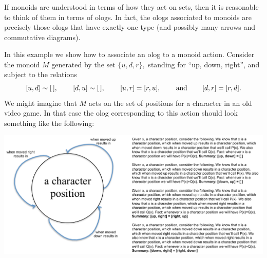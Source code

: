 \documentclass[CT4S-EN-RU]{subfiles}
\begin{document}

\subsubsection{}

\begin{blockENG}
If monoids are understood in terms of how they act on sets, then it is reasonable to think of them in terms of ologs. In fact, the ologs associated to monoids are precisely those ologs that have exactly one type (and possibly many arrows and commutative diagrams).
\end{blockENG}

\begin{blockRUS}
\end{blockRUS}

\begin{exampleENG}\label{ex:monoid as olog}
In this example we show how to associate an olog to a monoid action. Consider the monoid $M$ generated by the set $\{u,d,r\},$ standing for “up, down, right”, and subject to the relations $$[u,d]\sim[\,],\hspace{.3in}[d,u]\sim[\,],\hspace{.3in}[u,r]=[r,u],\hspace{.3in} \textnormal{and}\hspace{.3in} [d,r]=[r,d].$$
We might imagine that $M$ acts on the set of positions for a character in an old video game. In that case the olog corresponding to this action should look something like the following:
\begin{center}
\includegraphics[width=\textwidth]{monoidOlog}
\end{center}
\end{exampleENG}

\begin{exampleRUS}\label{ex:monoid as olog}
\end{exampleRUS}

\end{document}
